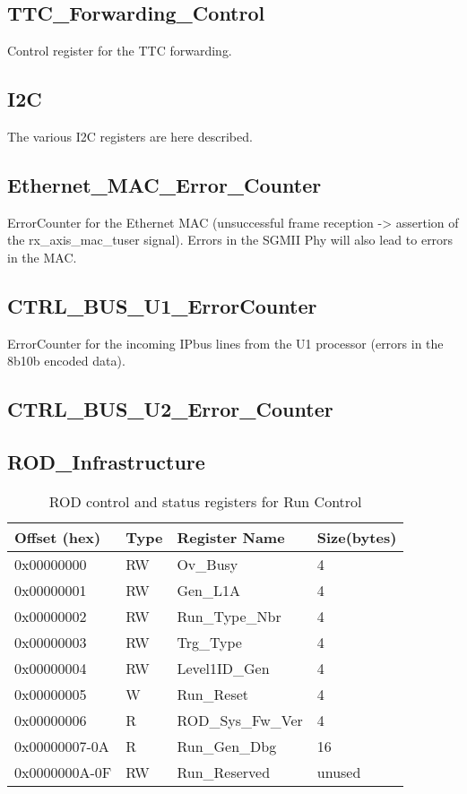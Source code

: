 \subsection{TTC\_Forwarding\_Control}
Control register for the TTC forwarding.

\subsection{I2C}
The various I2C registers are here described.

\subsection{Ethernet\_MAC\_Error\_Counter}
ErrorCounter for the Ethernet MAC (unsuccessful frame reception -> assertion of the rx\_axis\_mac\_tuser signal). Errors in the SGMII Phy will also lead to errors in the MAC.

\subsection{CTRL\_BUS\_U1\_ErrorCounter}
ErrorCounter for the incoming IPbus lines from the U1 processor (errors in the 8b10b encoded data).

\subsection{CTRL\_BUS\_U2\_Error\_Counter}


\subsection{ROD\_Infrastructure}
%
\begin {table}[H]
\begin{center}
\caption {ROD control and status registers for Run Control}
\label{rod_control_run}
\begin{tabular}{|l|l|l|l|}
\hline
Offset (hex)& Type & Register Name & Size(bytes)\\
\hline
0x00000000 & RW & Ov\_Busy & 4 \\
\hline
0x00000001 & RW & Gen\_L1A & 4 \\
\hline
0x00000002 & RW & Run\_Type\_Nbr & 4 \\
\hline
0x00000003 & RW & Trg\_Type & 4 \\
\hline
0x00000004 & RW & Level1ID\_Gen & 4 \\
\hline
0x00000005 & W & Run\_Reset & 4 \\
\hline
0x00000006 & R & ROD\_Sys\_Fw\_Ver & 4 \\
\hline
0x00000007-0A & R & Run\_Gen\_Dbg & 16 \\
\hline
0x0000000A-0F & RW & Run\_Reserved & unused \\
\hline
\end{tabular}
\end{center}
\end{table}



